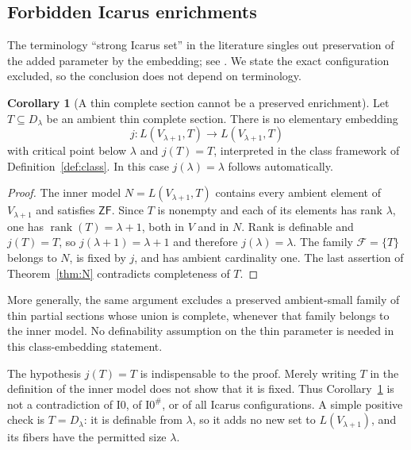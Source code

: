 \documentclass[11pt,letterpaper]{article}
\theoremstyle{definition}
\newtheorem{corollary}[definition]{Corollary}
\numberwithin{equation}{section}
\newcommand{\ZF}{\mathsf{ZF}}
\newcommand{\rank}{\operatorname{rank}}
\newcommand{\Izero}{\mathrm{I0}}
\newcommand{\FF}{\mathcal F}
\begin{document}
\subsection{Forbidden Icarus enrichments}

The terminology ``strong Icarus set'' in the literature singles out preservation of the added parameter by the embedding; see \cite[Section 3.6]{ABL}. We state the exact configuration excluded, so the conclusion does not depend on terminology.

\begin{corollary}[A thin complete section cannot be a preserved enrichment]\label{cor:icarus}
Let $T\subseteq D_\lambda$ be an ambient thin complete section. There is no elementary embedding
\begin{equation}\label{eq:icarus}
 j:L(V_{\lambda+1},T)\longrightarrow L(V_{\lambda+1},T)
\end{equation}
with critical point below $\lambda$ and $j(T)=T$, interpreted in the class framework of Definition~\ref{def:class}. In this case $j(\lambda)=\lambda$ follows automatically.
\end{corollary}

\begin{proof}
The inner model $N=L(V_{\lambda+1},T)$ contains every ambient element of $V_{\lambda+1}$ and satisfies $\ZF$. Since $T$ is nonempty and each of its elements has rank $\lambda$, one has $\rank(T)=\lambda+1$, both in $V$ and in $N$. Rank is definable and $j(T)=T$, so $j(\lambda+1)=\lambda+1$ and therefore $j(\lambda)=\lambda$. The family $\FF=\{T\}$ belongs to $N$, is fixed by $j$, and has ambient cardinality one. The last assertion of Theorem~\ref{thm:N} contradicts completeness of $T$.
\end{proof}

More generally, the same argument excludes a preserved ambient-small family of thin partial sections whose union is complete, whenever that family belongs to the inner model. No definability assumption on the thin parameter is needed in this class-embedding statement.

The hypothesis $j(T)=T$ is indispensable to the proof. Merely writing $T$ in the definition of the inner model does not show that it is fixed. Thus Corollary~\ref{cor:icarus} is not a contradiction of $\Izero$, of $\Izero^\#$, or of all Icarus configurations. A simple positive check is $T=D_\lambda$: it is definable from $\lambda$, so it adds no new set to $L(V_{\lambda+1})$, and its fibers have the permitted size $\lambda$.
\end{document}
